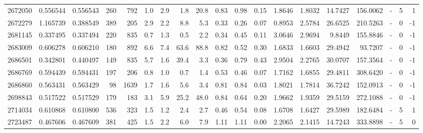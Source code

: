\begin{tabular}{rrrrrrrrrrrrrrrrlrr}
   2672050 & 0.556544 &   0.556543 &  260 &  792 &      1.0 &      2.9 &     1.8 &     20.8 &       0.83 &        0.98 &        0.15 &  1.8646 &  1.8032 &   14.7427 &  156.0062 &             - &        5 &          1 \\
   2672279 & 1.165739 &   0.388549 &  389 &  205 &      2.9 &      2.2 &     8.8 &      5.3 &       0.33 &        0.26 &        0.07 &  0.8953 &  2.5784 &   26.6525 &  210.5263 &             - &        0 &         -1 \\
   2681145 & 0.337495 &   0.337494 &  220 &  835 &      0.7 &      1.3 &     0.5 &      2.2 &       0.34 &        0.45 &        0.11 &  3.0646 &  2.9694 &    9.8449 &  155.8846 &             - &        0 &         -1 \\
   2683009 & 0.606278 &   0.606210 &  180 &  892 &      6.6 &      7.4 &    63.6 &     88.8 &       0.82 &        0.52 &        0.30 &  1.6833 &  1.6603 &   29.4942 &   93.7207 &             - &        0 &         -1 \\
   2686501 & 0.342801 &   0.440497 &  149 &  835 &      5.7 &      1.6 &    39.4 &      3.3 &       0.36 &        0.79 &        0.43 &  2.9504 &  2.2765 &   30.0707 &  157.3564 &             - &        0 &         -1 \\
   2686769 & 0.594439 &   0.594431 &  197 &  206 &      0.8 &      1.0 &     0.7 &      1.4 &       0.53 &        0.46 &        0.07 &  1.7162 &  1.6855 &   29.4811 &  308.6420 &             - &        0 &         -1 \\
   2686860 & 0.563431 &   0.563429 &   98 & 1639 &      1.7 &      1.6 &     5.6 &      3.4 &       0.81 &        0.84 &        0.03 &  1.8021 &  1.7814 &   36.7242 &  152.0913 &             - &        0 &         -1 \\
   2698843 & 0.517522 &   0.517529 &  179 &  183 &      3.1 &      5.9 &    25.2 &     48.0 &       0.84 &        0.64 &        0.20 &  1.9662 &  1.9359 &   29.5159 &  272.1088 &             - &        0 &         -1 \\
   2714034 & 0.610868 &   0.610800 &  536 &  323 &      1.5 &      1.2 &     2.4 &      2.7 &       0.46 &        0.54 &        0.08 &  1.6708 &  1.6427 &   29.5989 &  182.6484 &             - &        5 &          1 \\
   2723487 & 0.467606 &   0.467609 &  381 &  425 &      1.5 &      2.2 &     6.0 &      7.9 &       1.11 &        1.11 &        0.00 &  2.2065 &  2.1415 &   14.7243 &  333.8898 &             - &        5 &          0 \\

\end{tabular}
